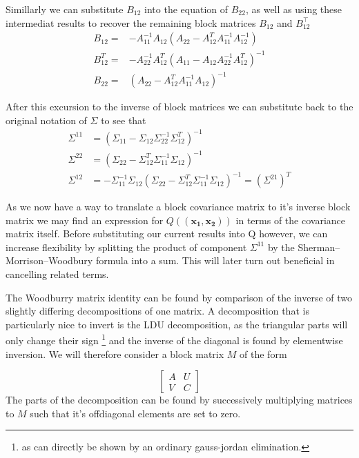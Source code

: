 \documentclass{article}
\begin{document}
Simillarly we can substitute $B_{12}$ into the equation of $B_{22}$, as well as using these intermediat results to recover the remaining block matrices $B_{12}$ and $B_{12}^\top$
\begin{align*}
B_{12}=&-A_{11}^{-1} A_{12}\left(A_{22}-A_{12}^{T} A_{11}^{-1} A_{12}^{-1}\right) \\
B_{12}^{T}=&-A_{22}^{-1} A_{12}^{T}\left(A_{11}-A_{12} A_{22}^{-1} A_{12}^{T}\right)^{-1} \\
B_{22}=&\left(A_{22}-A_{12}^{T} A_{11}^{-1} A_{12}\right)^{-1} 
\end{align*}

After this excursion to the inverse of block matrices we can substitute	back to the original notation of $\Sigma$ to see that
\begin{align*}
\Sigma^{11}&=\left(\Sigma_{11}-\Sigma_{12} \Sigma_{22}^{-1} \Sigma_{12}^{T}\right)^{-1} \\
\Sigma^{22}&=\left(\Sigma_{22}-\Sigma_{12}^{T} \Sigma_{11}^{-1} \Sigma_{12}\right)^{-1} \\
\Sigma^{12}&=-\Sigma_{11}^{-1} \Sigma_{12}\left(\Sigma_{22}-\Sigma_{12}^{T} \Sigma_{11}^{-1} \Sigma_{12}\right)^{-1}=\left(\Sigma^{21}\right)^{T}
\end{align*}

As we now have a way to translate a block covariance matrix to it's inverse block matrix we may find an expression for $Q((\mathbf{x_1},\mathbf{x_2}))$ in terms of the covariance matrix itself. Before substituting our current results into Q however, we can increase flexibility by splitting the product of component $\Sigma^{11}$ by the Sherman–Morrison–Woodbury formula into a sum. This will later turn out beneficial in cancelling related terms.
\bigbreak

The Woodburry matrix identity can be found by comparison of the inverse of two slightly differing decompositions of one matrix. A decomposition that is particularly nice to invert is the LDU decomposition, as the triangular parts will only change their sign \footnote{as can directly be shown by an ordinary gauss-jordan elimination.} and the inverse of the diagonal is found by elementwise inversion. We will therefore consider a block matrix $M$ of the form 


$$\left[ \begin{array}{ll}{A} & {U} \\ {V} & {C}\end{array}\right]$$
The parts of the decomposition can be found by successively multiplying matrices to $M$ such that it's offdiagonal elements are set to zero.
\end{document}
